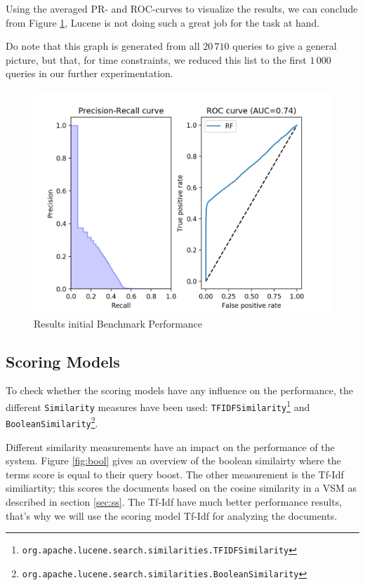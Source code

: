 \documentclass[11pt]{article}
\begin{document}
Using the averaged PR- and ROC-curves to visualize the results, we can conclude from Figure \ref{fig:initBP}, Lucene is not doing such a great job for the task at hand.

Do note that this graph is generated from all $20\,710$ queries to give a general picture, but that, for time constraints, we reduced this list to the first $1\,000$ queries in our further experimentation.

\begin{figure}[h!]
    \centering
    \includegraphics[width=\textwidth]{images/StandardAnalyzer}
    \caption{Results initial Benchmark Performance}
    \label{fig:initBP}
\end{figure}

\subsection{Scoring Models}
To check whether the scoring models have any influence on the performance, the different \texttt{Similarity} measures have been used: \texttt{TFIDFSimilarity}\footnote{\texttt{org.apache.lucene.search.similarities.TFIDFSimilarity}} and \texttt{BooleanSimilarity}\footnote{\texttt{org.apache.lucene.search.similarities.BooleanSimilarity}}. 

Different similarity measurements have an impact on the performance of the system. Figure \ref{fig:bool} gives an overview of the boolean similairty where the terms score is equal to their query boost. The other measurement is the Tf-Idf similiartity; this scores the documents based on the cosine similarity in a VSM as described in section \ref{sec:ss}. The Tf-Idf have much better performance results, that's why we will use the scoring model Tf-Idf for analyzing the documents.
\end{document}
